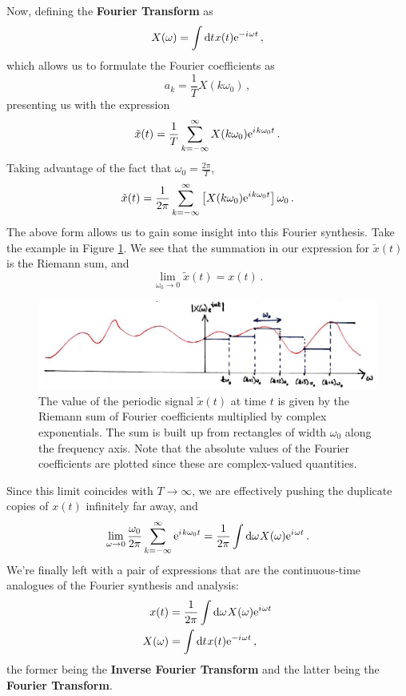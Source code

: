 %
Now, defining the \textbf{Fourier Transform} as
%
\begin{equation}
  X(\omega) = \int \mathrm{d}t\mkern1mu x(t)\mathrm{e}^{-{i\mkern1mu}\omega t} \,,
\end{equation}
%
which allows us to formulate the Fourier coefficients as
%
\begin{displaymath}
  a_k = \frac{1}{T} X(k\omega_0) \,,
\end{displaymath}
%
presenting us with the expression
%
\begin{displaymath}
  \tilde{x}(t) = \frac{1}{T}\sum_{k=-\infty}^\infty X(k\omega_0)\mathrm{e}^{{i\mkern1mu} k\omega_0 t} \,.
\end{displaymath}
%
Taking advantage of the fact that $\omega_0 = \frac{2\pi}{T}$,
%
\begin{displaymath}
  \tilde{x}(t) = \frac{1}{2\pi}\sum_{k=-\infty}^\infty \left[X(k\omega_0)\mathrm{e}^{{i\mkern1mu} k\omega_0 t}\right]\omega_0 \,.
\end{displaymath}
%
The above form allows us to gain some insight into this Fourier synthesis.
Take the example in Figure \ref{fig::lecture_5_riemann}. We see that the summation in our expression for
$\tilde{x}(t)$ is the Riemann sum, and
%
\begin{displaymath}
  \lim_{\omega_0\rightarrow 0}\tilde{x}(t) = x(t) \,.
\end{displaymath}
%
\begin{figure}[!htb]
  \includegraphics[width=\textwidth]{images/lecture_5_riemann.JPG}
  \caption{
    The value of the periodic signal $\tilde{x}(t)$ at time $t$ is given by the Riemann
    sum of Fourier coefficients multiplied by complex exponentials. The sum is built up
    from rectangles of width $\omega_0$ along the frequency axis. Note that the absolute
    values of the Fourier coefficients are plotted since these are complex-valued quantities.
  }
  \label{fig::lecture_5_riemann}
\end{figure}
%
Since this limit coincides with $T\rightarrow\infty$, we are effectively
pushing the duplicate copies of $x(t)$ infinitely far away, and
%
\begin{displaymath}
  \lim_{\omega\rightarrow 0}\frac{\omega_0}{2\pi}\sum_{k=-\infty}^\infty \mathrm{e}^{{i\mkern1mu} k\omega_0 t}
  = \frac{1}{2\pi}\int\mathrm{d}\omega\mkern1muX(\omega)\mathrm{e}^{{i\mkern1mu}\omega t} \,.
\end{displaymath}
%
We're finally left with a pair of expressions that are the continuous-time
analogues of the Fourier synthesis and analysis:
%
\begin{align}
  x(t) &= \frac{1}{2\pi}\int\mathrm{d}\omega\mkern1mu X(\omega)\mathrm{e}^{{i\mkern1mu}\omega t} \\
  X(\omega) &= \int\mathrm{d}t\mkern1mu x(t)\mathrm{e}^{-{i\mkern1mu}\omega t} \,,
\end{align}
%
the former being the \textbf{Inverse Fourier Transform} and the latter being
the \textbf{Fourier Transform}.

